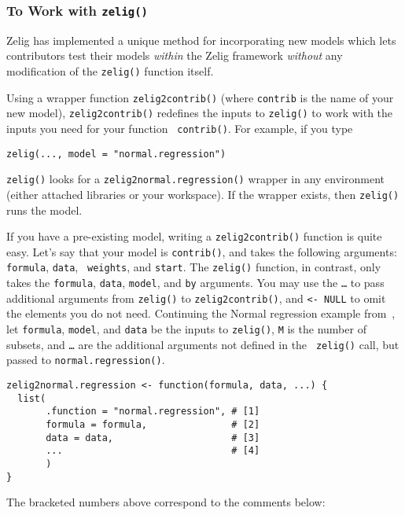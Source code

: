 \subsubsection{To Work with {\tt zelig()}}

Zelig has implemented a unique method for incorporating new models
which lets contributors test their models \emph{within} the Zelig
framework \emph{without} any modification of the {\tt zelig()}
function itself.  

Using a wrapper function {\tt zelig2contrib()} (where {\tt contrib} is
the name of your new model), {\tt zelig2contrib()} redefines the inputs to
{\tt zelig()} to work with the inputs you need for your function {\tt
contrib()}.  For example, if you type
\begin{verbatim}
zelig(..., model = "normal.regression")
\end{verbatim}
{\tt zelig()} looks for a {\tt zelig2normal.regression()} wrapper in any
environment (either attached libraries or your workspace).  If the
wrapper exists, then {\tt zelig()} runs the model.  

If you have a pre-existing model, writing a {\tt zelig2contrib()}
function is quite easy.  Let's say that your model is {\tt contrib()},
and takes the following arguments: {\tt formula}, {\tt data}, {\tt
  weights}, and {\tt start}.  The {\tt zelig()} function, in contrast,
only takes the {\tt formula}, {\tt data}, {\tt model}, and {\tt by}
arguments.  You may use the {\tt \dots} to pass additional arguments
from {\tt zelig()} to {\tt zelig2contrib()}, and {\tt <- NULL} to omit
the elements you do not need.  Continuing the Normal regression example
from~, let {\tt formula}, {\tt model}, and {\tt data} be
the inputs to {\tt zelig()}, {\tt M} is the number of subsets, and
{\tt \dots} are the additional arguments not defined in the {\tt
  zelig()} call, but passed to {\tt normal.regression()}.

\begin{verbatim}
zelig2normal.regression <- function(formula, data, ...) {
  list(
       .function = "normal.regression", # [1]
       formula = formula,               # [2]
       data = data,                     # [3]
       ...                              # [4]
       )
}
\end{verbatim}

The bracketed numbers above correspond to the comments below: 


